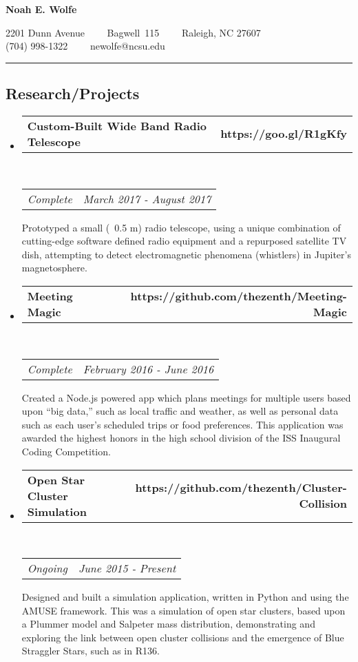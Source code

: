 \documentclass[10pt,letterpaper]{article}
\makeatletter
\newcommand{\headerrow}[2]
{\begin{tabular*}{\linewidth}{l@{\extracolsep{\fill}}r}
	#1 &
	#2 \\
\end{tabular*}}
\makeatother
\begin{document}
\begin{center}
{\LARGE \textbf{Noah E. Wolfe}}

2201 Dunn Avenue\ \ \textbullet
\ \ Bagwell\ 115\ \ \textbullet
\ \ Raleigh, NC 27607
\\
(704) 998-1322\ \ \textbullet
\ \ newolfe@ncsu.edu
\end{center}

\hrule
\vspace{-0.4em}
\subsection*{Research/Projects}

\begin{itemize}
	\parskip=0.1em

	\item
	\headerrow
		{\textbf{Custom-Built Wide Band Radio Telescope}}
		{\textbf{https://goo.gl/R1gKfy}}
	\\
	\headerrow
		{\emph{Complete}}
		{\emph{March 2017 - August 2017}}
	\begin{itemize*}
		Prototyped a small (~0.5 m) radio telescope, using a unique combination of cutting-edge software defined radio equipment and a repurposed satellite TV dish, attempting to detect electromagnetic phenomena (whistlers) in Jupiter’s magnetosphere.
	\end{itemize*}

	\item
	\headerrow
		{\textbf{Meeting Magic}}
		{\textbf{https://github.com/thezenth/Meeting-Magic}}
	\\
	\headerrow
		{\emph{Complete}}
		{\emph{February 2016 - June 2016}}
	\begin{itemize*}
		Created a Node.js powered app which plans meetings for multiple users based upon “big data,” such as local traffic and weather, as well as personal data such as each user’s scheduled trips or food preferences. This application was awarded the highest honors in the high school division of the ISS Inaugural Coding Competition.
	\end{itemize*}

	\item
	\headerrow
		{\textbf{Open Star Cluster Simulation}}
		{\textbf{https://github.com/thezenth/Cluster-Collision}}
	\\
	\headerrow
		{\emph{Ongoing}}
		{\emph{June 2015 - Present}}
	\begin{itemize*}
		Designed and built a simulation application, written in Python and using the AMUSE framework. This was a simulation of open star clusters, based upon a Plummer model and Salpeter mass distribution, demonstrating and exploring the link between open cluster collisions and the emergence of Blue Straggler Stars, such as in R136. 
	\end{itemize*}

\end{itemize}
\end{document}
